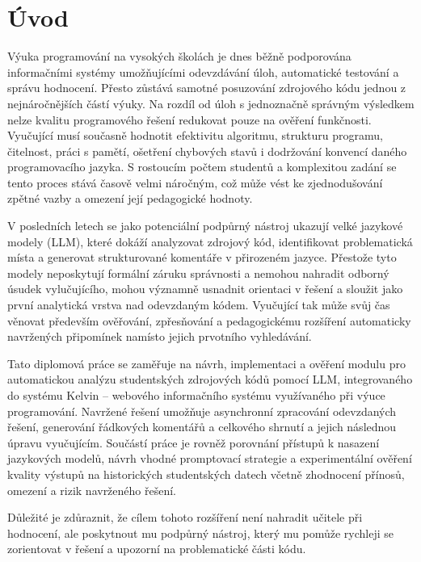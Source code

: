 \chapter{Úvod}
\label{ch:introduction}

Výuka programování na vysokých školách je dnes běžně podporována informačními systémy umožňujícími odevzdávání úloh, automatické testování a správu hodnocení.
Přesto zůstává samotné posuzování zdrojového kódu jednou z nejnáročnějších částí výuky.
Na rozdíl od úloh s jednoznačně správným výsledkem nelze kvalitu programového řešení redukovat pouze na ověření funkčnosti.
Vyučující musí současně hodnotit efektivitu algoritmu, strukturu programu, čitelnost, práci s pamětí, ošetření chybových stavů i dodržování konvencí daného programovacího jazyka.
S rostoucím počtem studentů a komplexitou zadání se tento proces stává časově velmi náročným, což může vést ke zjednodušování zpětné vazby a omezení její pedagogické hodnoty.

V posledních letech se jako potenciální podpůrný nástroj ukazují velké jazykové modely (LLM), které dokáží analyzovat zdrojový kód, identifikovat problematická místa a generovat strukturované komentáře v přirozeném jazyce.
Přestože tyto modely neposkytují formální záruku správnosti a nemohou nahradit odborný úsudek vylučujícího, mohou významně usnadnit orientaci v řešení a sloužit jako první analytická vrstva nad odevzdaným kódem.
Vyučující tak může svůj čas věnovat především ověřování, zpřesňování a pedagogickému rozšíření automaticky navržených připomínek namísto jejich prvotního vyhledávání.

Tato diplomová práce se zaměřuje na návrh, implementaci a ověření modulu pro automatickou analýzu studentských zdrojových kódů pomocí LLM, integrovaného do systému Kelvin – webového informačního systému využívaného při výuce programování.
Navržené řešení umožňuje asynchronní zpracování odevzdaných řešení, generování řádkových komentářů a celkového shrnutí a jejich následnou úpravu vyučujícím.
Součástí práce je rovněž porovnání přístupů k nasazení jazykových modelů, návrh vhodné promptovací strategie a experimentální ověření kvality výstupů na historických studentských datech včetně zhodnocení přínosů, omezení a rizik navrženého řešení.

Důležité je zdůraznit, že cílem tohoto rozšíření není nahradit učitele při hodnocení, ale poskytnout mu podpůrný nástroj, který mu pomůže rychleji se zorientovat v řešení a upozorní na problematické části kódu.

\endinput
